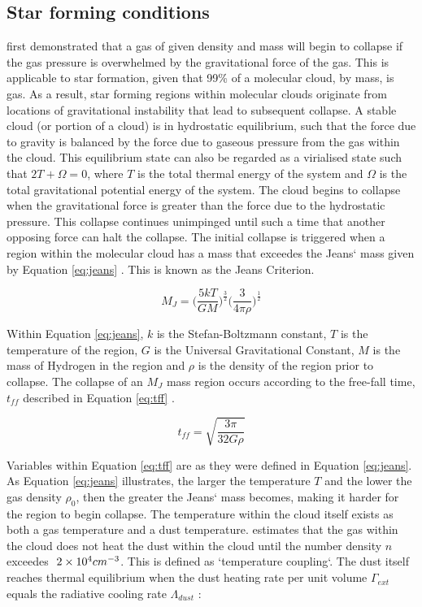 \documentclass{report}
\begin{document}
\subsection{Star forming conditions} \label{sec:conditions}
\textcite{jeans} first demonstrated that a gas of given density and mass will begin to collapse if the gas pressure is overwhelmed by the gravitational force of the gas. This is applicable to star formation, given that 99\% of a molecular cloud, by mass, is gas. As a result, star forming regions within molecular clouds originate from locations of gravitational instability that lead to subsequent collapse. A stable cloud (or portion of a cloud) is in hydrostatic equilibrium, such that the force due to gravity is balanced by the force due to gaseous pressure from the gas within the cloud. This equilibrium state can also be regarded as a virialised state such that $2T+\Omega=0$, where $T$ is the total thermal energy of the system and $\Omega$ is the total gravitational potential energy of the system. The cloud begins to collapse when the gravitational force is greater than the force due to the hydrostatic pressure. This collapse continues unimpinged until such a time that another opposing force can halt the collapse. The initial collapse is triggered when a region within the molecular cloud has a mass that exceedes the Jeans` mass given by Equation \ref{eq:jeans} \parencite{lecture}. This is known as the Jeans Criterion.

\begin{equation}\label{eq:jeans}
  M_{J} = \Bigg( \frac{5kT}{GM} \Bigg )^\frac{3}{2} \Bigg( \frac{3}{4\pi\rho} \Bigg )^\frac{1}{2}
\end{equation}

Within Equation \ref{eq:jeans}, $k$ is the Stefan-Boltzmann constant, $T$ is the temperature of the region, $G$ is the Universal Gravitational Constant, $M$ is the mass of Hydrogen in the region and $\rho$ is the density of the region prior to collapse. The collapse of an $M_{J}$ mass region occurs according to the free-fall time, $t_{ff}$ described in Equation \ref{eq:tff} \parencite{jeans}.

\begin{equation}\label{eq:tff}
  t_{ff} = \sqrt{\frac{3\pi}{32G\rho}}
\end{equation}

Variables within Equation \ref{eq:tff} are as they were defined in Equation \ref{eq:jeans}. As Equation \ref{eq:jeans} illustrates, the larger the temperature $T$ and the lower the gas density $\rho_{0}$, then the greater the Jeans` mass becomes, making it harder for the region to begin collapse. The temperature within the cloud itself exists as both a gas temperature and a dust temperature. \textcite{decouple} estimates that the gas within the cloud does not heat the dust within the cloud until the number density $n$ exceedes $~2\times10^{4}\/cm^{-3}$. This is defined as `temperature coupling`. The dust itself reaches thermal equilibrium when the dust heating rate per unit volume $\Gamma_{ext}$ equals the radiative cooling rate $\Lambda_{dust}$ \parencite{treecol}:
\end{document}
